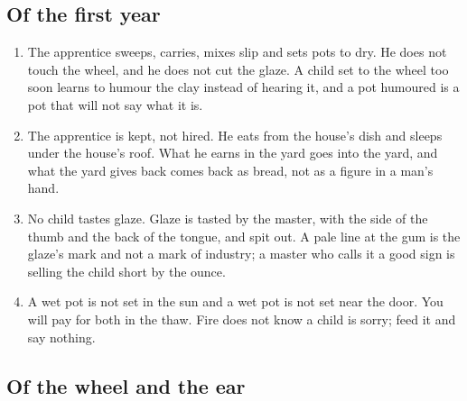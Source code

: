 \documentclass{design/chronicle}
\begin{document}
\subsection*{Of the first year}

\begin{enumerate}[leftmargin=1.4em,itemsep=1pt,topsep=3pt,parsep=0pt]

\item The apprentice sweeps, carries, mixes slip and sets pots to dry. He does not touch the wheel, and he does not cut the glaze. A child set to the wheel too soon learns to humour the clay instead of hearing it, and a pot humoured is a pot that will not say what it is.

\item The apprentice is kept, not hired. He eats from the house’s dish and sleeps under the house’s roof. What he earns in the yard goes into the yard, and what the yard gives back comes back as bread, not as a figure in a man’s hand.

\item No child tastes glaze. Glaze is tasted by the master, with the side of the thumb and the back of the tongue, and spit out. A pale line at the gum is the glaze’s mark and not a mark of industry; a master who calls it a good sign is selling the child short by the ounce.

\item A wet pot is not set in the sun and a wet pot is not set near the door. You will pay for both in the thaw. Fire does not know a child is sorry; feed it and say nothing.

\end{enumerate}

\subsection*{Of the wheel and the ear}
\end{document}
